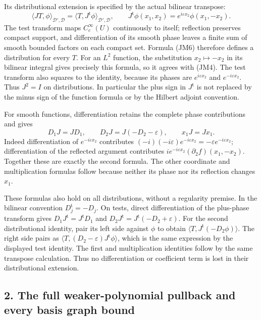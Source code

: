 \documentclass[
  11pt,
]{article}
\begin{document}
Its distributional extension is specified by the actual bilinear
transpose: \[
 \langle JT,\phi\rangle_{\mathcal D',\mathcal D}
    =\langle T,J^{\mathrm t}\phi\rangle_{\mathcal D',\mathcal D},
 \qquad
 J^{\mathrm t}\phi(x_1,x_2)
      =e^{i\varepsilon x_2}\phi(x_1,-x_2).
 \tag{JM6}
\] The test transform maps
\(C_c^\infty(U)\) continuously to itself; reflection preserves
compact support, and differentiation of its smooth phase leaves a finite
sum of smooth bounded factors on each compact set. Formula (JM6)
therefore defines a distribution for every \(T\). For
an \(L^2\) function, the substitution
\(x_2\mapsto-x_2\) in its bilinear integral gives precisely this
formula, so it agrees with (JM4). The test transform also squares to the
identity, because its phases are \(e^{i\varepsilon x_2}\) and
\(e^{-i\varepsilon x_2}\). Thus \(J^2=I\) on distributions.
In particular the plus sign in \(J^{\mathrm t}\) is not replaced
by the minus sign of the function formula or by the Hilbert adjoint
convention.

For smooth functions, differentiation retains the complete phase
contributions and gives \[
 D_1J=JD_1,\qquad
 D_2J=J(-D_2-\varepsilon),\qquad
 x_1J=Jx_1 .
 \tag{JM7}
\] Indeed differentiation
of \(e^{-i\varepsilon x_2}\) contributes \((-i)(-i\varepsilon)e^{-i\varepsilon x_2}=-\varepsilon e^{-i\varepsilon x_2}\);
differentiation of the reflected argument contributes
\(i e^{-i\varepsilon x_2}(\partial_2f)(x_1,-x_2)\). Together these are exactly the second formula.
The other coordinate and multiplication formulas follow because neither
its phase nor its reflection changes \(x_1\).

These formulas also hold on all distributions, without a regularity
premise. In the bilinear convention \(D_j^{\mathrm t}=-D_j\). On tests,
direct differentiation of the plus-phase transform gives
\(D_1J^{\mathrm t}=J^{\mathrm t}D_1\) and \(D_2J^{\mathrm t}=J^{\mathrm t}(-D_2+\varepsilon)\). For the second
distributional identity, pair its left side against
\(\phi\) to obtain \(\langle T,J^{\mathrm t}(-D_2\phi)\rangle\). The right
side pairs as \(\langle T,(D_2-\varepsilon)J^{\mathrm t}\phi\rangle\), which is the same expression by
the displayed test identity. The first and multiplication identities
follow by the same transpose calculation. Thus no differentiation or
coefficient term is lost in their distributional extension.

\subsection{2. The full weaker-polynomial pullback and every basis graph
bound}\label{the-full-weaker-polynomial-pullback-and-every-basis-graph-bound}
\end{document}
